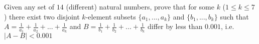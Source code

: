 Given any set of $14$ (different) natural numbers, prove that for some $k$ ($1 \le k \le 7$) there exist two disjoint $k$-element subsets $\{a_1,...,a_k\}$ and $\{b_1,...,b_k\}$ such that $A =\frac{1}{a_1}+\frac{1}{a_2}+...+\frac{1}{a_k}$ and $B =\frac{1}{b_1}+\frac{1}{b_2}+...+\frac{1}{b_k}$ differ by less than $0.001$, i.e. $|A-B| < 0.001$